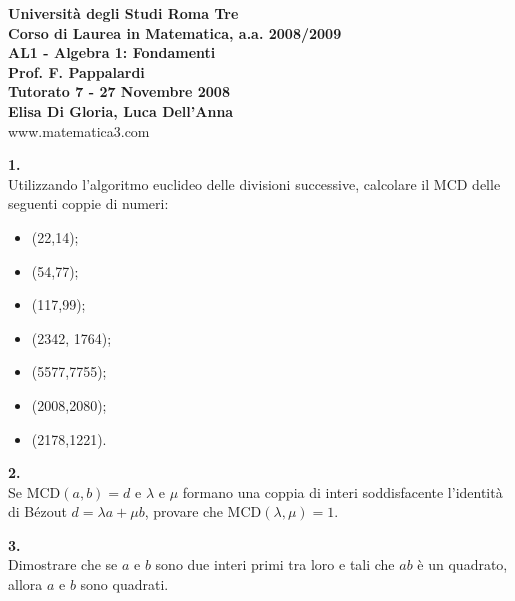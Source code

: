 \documentclass[italian,a4paper,11pt]
{article}
\begin{document}
\begin{center}


\textbf{Universit\`a degli Studi Roma Tre}\\

\textbf{Corso di Laurea in Matematica, a.a. 2008/2009}\\

\textbf{AL1 - Algebra 1: Fondamenti}\\

\textbf{Prof. F. Pappalardi}\\

\textbf{Tutorato 7 - 27 Novembre 2008}\\

\textbf{Elisa Di Gloria, Luca Dell'Anna}\\

www.matematica3.com\\
\end{center}



\vspace{0.5cm}




\noindent
\begin{Ex}\textbf{ 1.}\\
Utilizzando l'algoritmo euclideo delle divisioni successive, calcolare il MCD delle seguenti coppie di numeri:
\begin{itemize}
	\item (22,14);
	\item (54,77);
	\item (117,99);
	\item (2342, 1764);
	\item (5577,7755);
	\item (2008,2080);
	\item (2178,1221).
\end{itemize}
\end{Ex}

\vspace{0.4cm}
\noindent
\begin{Ex}\textbf{ 2.}\\
Se MCD$(a,b)=d$ e $\lambda$ e $\mu$ formano una coppia di interi soddisfacente l'identit\`a di B\'ezout $d=\lambda a + \mu b$, provare che MCD$(\lambda,\mu)=1$.
\end{Ex}

\vspace{0.4cm}
\noindent
\begin{Ex}\textbf{ 3.}\\
Dimostrare che se $a$ e $b$ sono due interi primi tra loro e tali che $ab$ \`e un quadrato, allora $a$ e $b$ sono quadrati.
\end{Ex}
\end{document}
